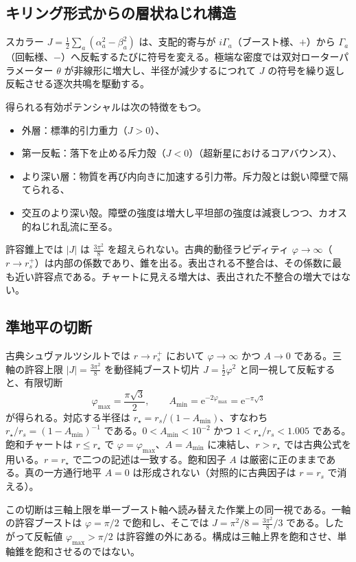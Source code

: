 \documentclass[a4paper]{article}
\newcommand{\Jbound}{\frac{3\pi^2}{8}}
\begin{document}
\subsection{キリング形式からの層状ねじれ構造}

スカラー $J = \frac12\sum_a(\alpha_a^2-\beta_a^2)$ は、支配的寄与が $i\Gamma_a$（ブースト様、$+$）から $\Gamma_a$（回転様、$-$）へ反転するたびに符号を変える。極端な密度では双対ローターパラメーター $\theta$ が非線形に増大し、半径が減少するにつれて $J$ の符号を繰り返し反転させる逐次共鳴を駆動する。

得られる有効ポテンシャルは次の特徴をもつ。
\begin{itemize}
\item 外層：標準的引力重力（$J > 0$）、
\item 第一反転：落下を止める斥力殻（$J < 0$）（超新星におけるコアバウンス）、
\item より深い層：物質を再び内向きに加速する引力帯。斥力殻とは鋭い障壁で隔てられる、
\item 交互のより深い殻。障壁の強度は増大し平坦部の強度は減衰しつつ、カオス的ねじれ乱流に至る。
\end{itemize}
許容錐上では $|J|$ は $\Jbound$ を超えられない。古典的動径ラピディティ $\varphi\to\infty$（$r\to r_s^+$）は内部の係数であり、錐を出る。表出される不整合は、その係数に最も近い許容点である。チャートに見える増大は、表出された不整合の増大ではない。

\subsection{準地平の切断}
\label{subsec:quasi-horizon}

古典シュヴァルツシルトでは $r\to r_s^+$ において $\varphi\to\infty$ かつ $A\to 0$ である。三軸の許容上限 $|J|=\Jbound$ を動径純ブースト切片 $J=\tfrac12\varphi^2$ と同一視して反転すると、有限切断
\[
\varphi_{\max}=\frac{\pi\sqrt{3}}{2},\qquad A_{\min}=\mathrm{e}^{-2\varphi_{\max}}=\mathrm{e}^{-\pi\sqrt{3}}
\]
が得られる。対応する半径は $r_\star=r_s/(1-A_{\min})$、すなわち $r_\star/r_s=(1-A_{\min})^{-1}$ である。$0<A_{\min}<10^{-2}$ かつ $1<r_\star/r_s<1.005$ である。飽和チャートは $r\le r_\star$ で $\varphi=\varphi_{\max}$、$A=A_{\min}$ に凍結し、$r>r_\star$ では古典公式を用いる。$r=r_\star$ で二つの記述は一致する。飽和因子 $A$ は厳密に正のままである。真の一方通行地平 $A=0$ は形成されない（対照的に古典因子は $r=r_s$ で消える）。

この切断は三軸上限を単一ブースト軸へ読み替えた作業上の同一視である。一軸の許容ブーストは $\varphi=\pi/2$ で飽和し、そこでは $J=\pi^2/8=\Jbound/3$ である。したがって反転値 $\varphi_{\max}>\pi/2$ は許容錐の外にある。構成は三軸上界を飽和させ、単軸錐を飽和させるのではない。
\end{document}
